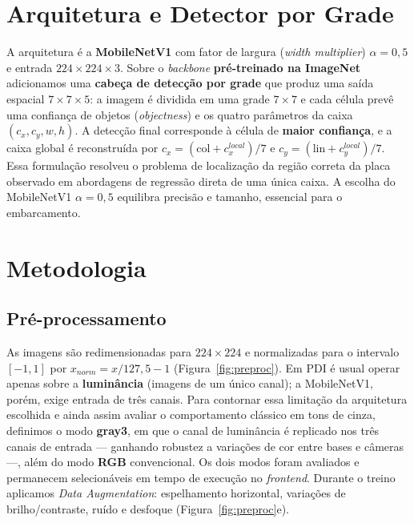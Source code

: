 \documentclass[conference]{IEEEtran}
\begin{document}
\section{Arquitetura e Detector por Grade}
A arquitetura é a \textbf{MobileNetV1} com fator de largura (\emph{width
multiplier}) $\alpha=0{,}5$ e entrada $224\times224\times3$. Sobre o
\emph{backbone} \textbf{pré-treinado na ImageNet} adicionamos uma \textbf{cabeça de detecção por grade}
que produz uma saída espacial $7\times7\times5$: a imagem é dividida em uma grade
$7\times7$ e cada célula prevê uma confiança de objetos (\emph{objectness}) e os
quatro parâmetros da caixa $(c_x, c_y, w, h)$. A detecção final corresponde à
célula de \textbf{maior confiança}, e a caixa global é reconstruída por
$c_x = (\text{col}+c_x^{local})/7$ e $c_y = (\text{lin}+c_y^{local})/7$. Essa
formulação resolveu o problema de localização da região correta da placa observado
em abordagens de regressão direta de uma única caixa. A escolha do MobileNetV1
$\alpha=0{,}5$ equilibra precisão e tamanho, essencial para o embarcamento.

\section{Metodologia}
\subsection{Pré-processamento}
As imagens são redimensionadas para $224\times224$ e normalizadas para o intervalo
$[-1,1]$ por $x_{norm}=x/127{,}5-1$ (Figura~\ref{fig:preproc}). Em PDI é usual
operar apenas sobre a \textbf{luminância} (imagens de um único canal); a
MobileNetV1, porém, exige entrada de três canais. Para contornar essa limitação
da arquitetura escolhida e ainda assim avaliar o comportamento clássico em tons
de cinza, definimos o modo \textbf{gray3}, em que o canal de luminância é
replicado nos três canais de entrada --- ganhando robustez a variações de cor
entre bases e câmeras ---, além do modo \textbf{RGB} convencional. Os dois modos
foram avaliados e permanecem selecionáveis em tempo de execução no
\emph{frontend}. Durante o treino aplicamos \emph{Data Augmentation}:
espelhamento horizontal, variações de brilho/contraste, ruído e desfoque
(Figura~\ref{fig:preproc}e).
\end{document}
